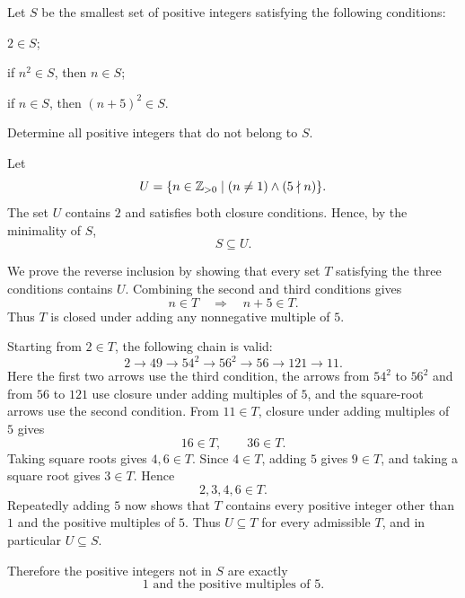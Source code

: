     \begin{expectedproblem}[2017 Putnam]
        Let $S$ be the smallest set of positive integers satisfying the
        following conditions:
        \begin{problemchoices}
            \item $2\in S$;
            \item if $n^2\in S$, then $n\in S$;
            \item if $n\in S$, then $(n+5)^2\in S$.
        \end{problemchoices}
        Determine all positive integers that do not belong to $S$.
    \end{expectedproblem}

    \begin{solution}
        Let
        \[
            U=\{n\in\mathbb{Z}_{>0}\mid (n\neq1)\land(5\nmid n)\}.
        \]
        The set $U$ contains $2$ and satisfies both closure conditions. Hence,
        by the minimality of $S$,
        \[
            S\subseteq U.
        \]

        We prove the reverse inclusion by showing that every set $T$ satisfying
        the three conditions contains $U$. Combining the second and third
        conditions gives
        \[
            n\in T
            \quad\Longrightarrow\quad
            n+5\in T.
        \]
        Thus $T$ is closed under adding any nonnegative multiple of $5$.

        Starting from $2\in T$, the following chain is valid:
        \[
            2
            \longrightarrow
            49
            \longrightarrow
            54^2
            \longrightarrow
            56^2
            \longrightarrow
            56
            \longrightarrow
            121
            \longrightarrow
            11.
        \]
        Here the first two arrows use the third condition, the arrows from
        $54^2$ to $56^2$ and from $56$ to $121$ use closure under adding
        multiples of $5$, and the square-root arrows use the second condition.
        From $11\in T$, closure under adding multiples of $5$ gives
        \[
            16\in T,
            \qquad
            36\in T.
        \]
        Taking square roots gives $4,6\in T$. Since $4\in T$, adding $5$
        gives $9\in T$, and taking a square root gives $3\in T$. Hence
        \[
            2,3,4,6\in T.
        \]
        Repeatedly adding $5$ now shows that $T$ contains every positive
        integer other than $1$ and the positive multiples of $5$. Thus
        $U\subseteq T$ for every admissible $T$, and in particular
        $U\subseteq S$.

        Therefore the positive integers not in $S$ are exactly
        \[
            \boxed{1\text{ and the positive multiples of }5}.
        \]
    \end{solution}

